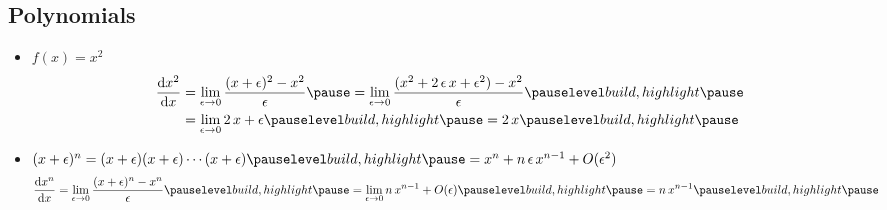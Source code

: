 \begin{slide}
\section{Polynomials}

\begin{PauseHighLight}
  \begin{itemize}
  \item $f(x)=x^2$
    \begin{align*}
      \frac{\dd x^2}{\dd x} &= \lim_{\epsilon\rightarrow 0}
      \frac{(x+\epsilon)^2 - x^2}{\epsilon}\pause
      =  \lim_{\epsilon\rightarrow 0}
      \frac{(x^2 + 2\,\epsilon\,x + \epsilon^2) -
                              x^2}{\epsilon}\pauseb
                              \\
      &= \lim_{\epsilon\rightarrow 0} 2\,x + \epsilon\pauseb = 2\,x\pauseb
    \end{align*}
  \item $(x+\epsilon)^n =
    (x+\epsilon)(x+\epsilon)\cdots(x+\epsilon)\pauseb = x^n +
    n\,\epsilon\,x^{n-1} + O(\epsilon^2)$\pauseb
     \begin{align*}
      \frac{\dd x^n}{\dd x} &= \lim_{\epsilon\rightarrow 0}
      \frac{(x+\epsilon)^n - x^n}{\epsilon}\pauseb
      =   \lim_{\epsilon\rightarrow 0} n\,x^{n-1} + O(\epsilon)\pauseb = n\,x^{n-1}\pauseb
    \end{align*}
  \end{itemize}
\end{PauseHighLight}

\end{slide}


